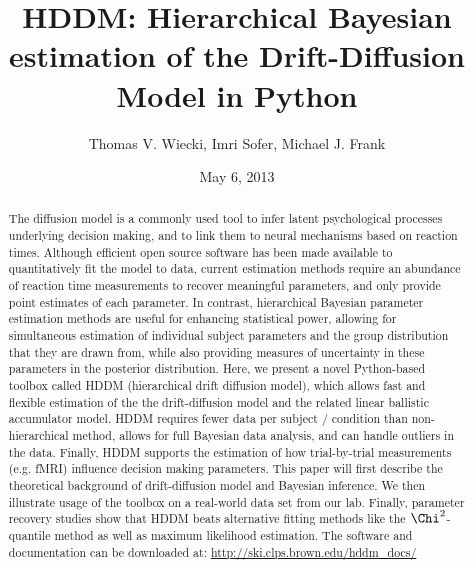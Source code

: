 \documentclass[letterpaper,10pt,english]{article}
\title{HDDM: Hierarchical Bayesian estimation of the Drift-Diffusion Model in Python}
\date{May 6, 2013}
\author{Thomas V. Wiecki, Imri Sofer, Michael J. Frank}
\begin{document}
\maketitle

\begin{abstract}
\label{abstract:abstract}
The diffusion model is a commonly used tool to infer latent psychological processes underlying decision making, and to link them to neural mechanisms based on reaction times. Although efficient open source software has been made available to quantitatively fit the model to data, current estimation methods require an abundance of reaction time measurements to recover meaningful parameters, and only provide point estimates of each parameter.  In contrast, hierarchical Bayesian parameter estimation methods are useful for enhancing statistical power, allowing for simultaneous estimation of individual subject parameters and the group distribution that they are drawn from, while also providing measures of uncertainty in these parameters in the posterior distribution. Here, we present a novel Python-based toolbox called HDDM (hierarchical drift diffusion model), which allows fast and flexible estimation of the the drift-diffusion model and the related linear ballistic accumulator model. HDDM requires fewer data per subject / condition than non-hierarchical method, allows for full Bayesian data analysis, and can handle outliers in the data.  Finally, HDDM supports the estimation of how trial-by-trial measurements (e.g. fMRI) influence decision making parameters. This paper will first describe the theoretical background of drift-diffusion model and Bayesian inference. We then illustrate usage of the toolbox on a real-world data set from our lab. Finally, parameter recovery studies show that HDDM beats alternative fitting methods like the $\Chi^2$-quantile method as well as maximum likelihood estimation. The software and documentation can be downloaded at: \href{http://ski.clps.brown.edu/hddm\_docs/}{http://ski.clps.brown.edu/hddm\_docs/}
\end{abstract}

\end{document}
